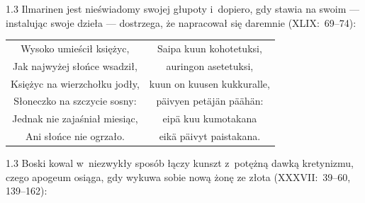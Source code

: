 \documentclass[11pt,a4paper,twoside]{report}
\begin{document}
\begin{spacing}{1.3}
Ilmarinen jest nieświadomy swojej głupoty i~dopiero, gdy stawia na swoim --- instalując swoje dzieła --- dostrzega, że napracował się daremnie (XLIX:~69--74):
\end{spacing}
{\centering
\small
\begin{longtable}{c c}
Wysoko umieścił księżyc, & Saipa kuun kohotetuksi, \\
Jak najwyżej słońce wsadził, & auringon asetetuksi, \\
Księżyc na wierzchołku jodły, & kuun on kuusen kukkuralle, \\
Słoneczko na szczycie sosny: & päivyen petäjän päähän: \\
Jednak nie zajaśniał miesiąc, & eipä kuu kumotakana \\
Ani słońce nie ogrzało. & eikä päivyt paistakana. \\
\end{longtable}
}
\begin{spacing}{1.3}
Boski kowal w~niezwykły sposób łączy kunszt z~potężną dawką kretynizmu, czego apogeum osiąga, gdy wykuwa sobie nową żonę ze złota (XXXVII:~39--60, 139--162):
\end{spacing}
\end{document}
